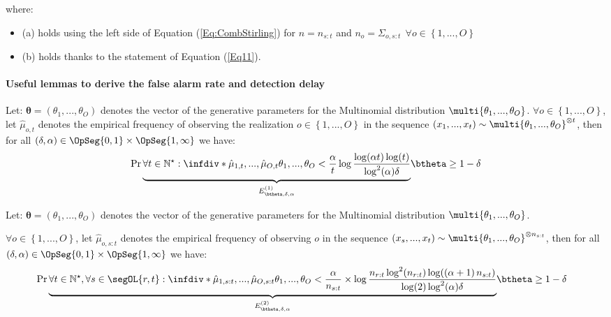 \documentclass{article} %
\begin{document}
where:
\begin{itemize}
\setlength\itemsep{0.25em}
    \item (a) holds using the left side of Equation (\ref{Eq:CombStirling}) for $n = n_{s:t}$ and $n_o = \Sigma_{o,s:t} \ \ \forall o \in \left\lbrace 1,..., O \right\rbrace$
    \item (b) holds thanks to the statement of Equation (\ref{Eq11}).
\end{itemize}


\paragraph{Useful lemmas to derive the false alarm rate and detection delay} 

	
\begin{lemma}
Let: $\boldsymbol{\theta}  = \left(\theta_1,..., \theta_O \right)$ denotes the vector of the generative parameters for the Multinomial distribution $\multi{\theta_1,..., \theta_O}$.
$\forall o \in \left\lbrace 1,..., O \right\rbrace$, let $\hat{\mu}_{o,t}$ denotes the empirical frequency of observing the realization $o \in \left\lbrace 1,..., O \right\rbrace$ in the sequence $\left(x_1,...,x_t\right) \sim \multi{\theta_1,..., \theta_O}^{\otimes t}$, then for all $\left(\delta, \alpha \right) \in \OpSeg{0,1}\times \OpSeg{1, \infty}$ we have:
\begin{align*}
\Pr{\underbrace{\forall t \in \mathbb{N}^\star: \infdiv*{\hat{\mu}_{1,t}, ..., \hat{\mu}_{O,t}}{\theta_1,..., \theta_O} <  \frac{ 
\alpha  }{t}\log \frac{\log(\alpha t)\log(t)}{\log^2(\alpha)\delta}}_{E^{(1)}_{\btheta,\delta,\alpha}}}{\btheta}
\geq  1-\delta  
\end{align*}
\label{lemma::B1}
\end{lemma}


\begin{lemma}
Let: $\boldsymbol{\theta}  = \left(\theta_1,..., \theta_O \right)$ denotes the vector of the generative parameters for the Multinomial distribution $\multi{\theta_1,..., \theta_O}$.

$\forall o \in \left\lbrace 1,..., O \right\rbrace$, let $\hat{\mu}_{o,s:t}$ denotes the empirical frequency of observing $o$ in the sequence $\left(x_s,...,x_t\right) \sim \multi{\theta_1,..., \theta_O}^{\otimes n_{s:t}}$, then for all $\left(\delta, \alpha \right) \in \OpSeg{0,1}\times \OpSeg{1, \infty}$ we have:
\vspace{-0.5em}
\begin{align*}
&\Pr{ \underbrace{\forall t \in \mathbb{N}^\star, \forall  s \in \segOL{r,t} : \infdiv*{\hat{\mu}_{1,s:t}, ..., \hat{\mu}_{O,s:t}}{\theta_1,..., \theta_O} <  \frac{ 
\alpha}{n_{s:t}} \times  \log \frac{n_{r:t}\log^2(n_{r:t})\log(\left(\alpha +1 \right) n_{s:t})}{\log(2)\log^2(\alpha)\delta}}_{E^{(2)}_{\btheta,\delta,\alpha}}}{\btheta}
\geq  1-\delta  
\end{align*}
\label{lemma::B2}
\end{lemma}
\end{document}
